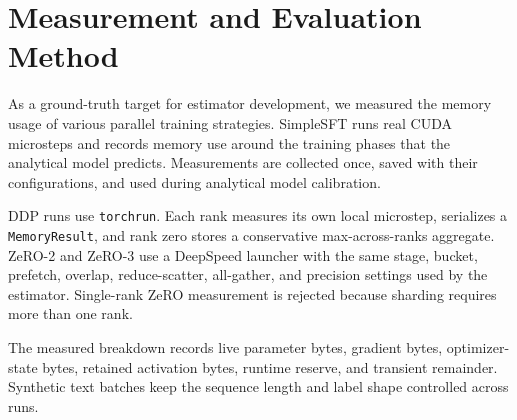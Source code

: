 \section{Measurement and Evaluation Method}
As a ground-truth target for estimator development, we measured the memory usage
of various parallel training strategies. SimpleSFT runs
real CUDA microsteps and records memory use around the training phases that the
analytical model predicts. Measurements are collected once, saved with their configurations, and
used during analytical model calibration.

DDP runs use \texttt{torchrun}. Each rank measures its own local microstep,
serializes a \texttt{MemoryResult}, and rank zero stores a conservative
max-across-ranks aggregate. ZeRO-2 and ZeRO-3 use a DeepSpeed launcher with the
same stage, bucket, prefetch, overlap, reduce-scatter, all-gather, and precision
settings used by the estimator. Single-rank ZeRO measurement is rejected
because sharding requires more than one rank.

The measured breakdown records live parameter bytes, gradient bytes,
optimizer-state bytes, retained activation bytes, runtime reserve, and
transient remainder. Synthetic text batches keep the sequence length and label
shape controlled across runs.
